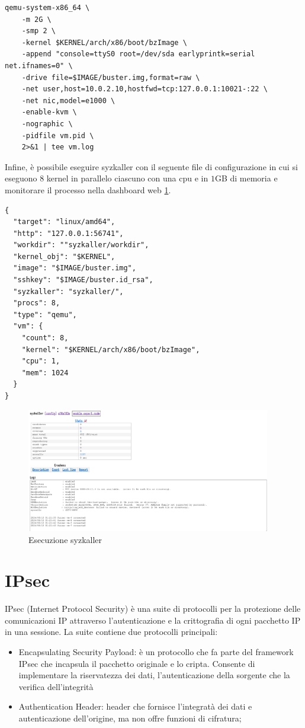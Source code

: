 \documentclass{article}
\begin{document}
\begin{verbatim}
qemu-system-x86_64 \
	-m 2G \
	-smp 2 \
	-kernel $KERNEL/arch/x86/boot/bzImage \
	-append "console=ttyS0 root=/dev/sda earlyprintk=serial net.ifnames=0" \
	-drive file=$IMAGE/buster.img,format=raw \
	-net user,host=10.0.2.10,hostfwd=tcp:127.0.0.1:10021-:22 \
	-net nic,model=e1000 \
	-enable-kvm \
	-nographic \
	-pidfile vm.pid \
	2>&1 | tee vm.log   
\end{verbatim}

Infine, è possibile eseguire syzkaller con il seguente file di configurazione in cui si 
eseguono $8$ kernel in parallelo ciascuno con una cpu e in $1$GB di memoria e monitorare
il processo nella dashboard web \cref{fig:syz-dashboard}.
\begin{verbatim}
{
  "target": "linux/amd64",
  "http": "127.0.0.1:56741",
  "workdir": ""syzkaller/workdir",
  "kernel_obj": "$KERNEL",
  "image": "$IMAGE/buster.img",
  "sshkey": "$IMAGE/buster.id_rsa",
  "syzkaller": "syzkaller/",
  "procs": 8,
  "type": "qemu",
  "vm": {
    "count": 8,
    "kernel": "$KERNEL/arch/x86/boot/bzImage",
    "cpu": 1,
    "mem": 1024
  }
} 
\end{verbatim}

\begin{figure}[h]
  \begin{center}
    \includegraphics[width=0.95\textwidth]{figures/syzkaller-dashboard.png}
  \end{center}
  \caption{Esecuzione syzkaller}\label{fig:syz-dashboard}
\end{figure}

\clearpage
\section{IPsec}
IPsec (Internet Protocol Security) è una suite di protocolli per la protezione delle
comunicazioni IP attraverso l'autenticazione e la crittografia di ogni pacchetto IP in una
sessione. La suite contiene due protocolli principali:
\begin{itemize}
  \item Encapsulating Security Payload: è un protocollo che fa parte del framework IPsec 
    che incapsula il pacchetto originale e lo cripta. Consente di implementare la
    riservatezza dei dati, l'autenticazione della sorgente che la verifica dell'integrità
  \item Authentication Header: header che fornisce l'integratà dei dati e autenticazione 
    dell'origine, ma non offre funzioni di cifratura;
\end{itemize}
\end{document}

